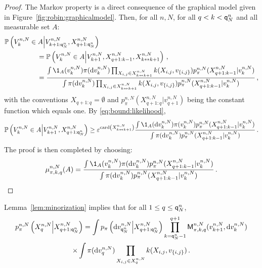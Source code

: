 \begin{proof}
The Markov property is a direct consequence of the graphical model given in Figure~\ref{fig:robin:graphicalmodel}. Then, for all $n,N$, for all $q< k < {\mathsf{q}}^{n}_{N}$ and all measurable set $A$:
\begin{align*}
\mathbb{P}\left(V^{n,N}_{k}\in A\middle|V^{n,N}_{k+1:\ordermax{n}{N}},X_{q+1:\ordermax{n}{N}}^{n,N}\right) &\\
 &\hspace{-3.2cm}= \mathbb{P}\left(V^{n,N}_{k}\in A\middle|V^{n,N}_{k+1},X^{n,N}_{q+1:k-1},X^{n,N}_{k\link k+1}\right)\eqsp,\\
 &\hspace{-3.2cm}= \frac{\int \1_{A}(v^{n,N}_{k})\pi(\rmd v^{n,N}_{k})\prod_{X_{i,j}\in X^{n,N}_{k\link k+1}}\condlik(X_{i,j},v_{\{i,j\}})p_{\pi}^{n,N}(X^{n,N}_{q+1:k-1}|v^{n,N}_{k})}{\int \pi(\rmd v^{n,N}_{k})\prod_{X_{i,j}\in X^{n,N}_{k\link k+1}}\condlik(X_{i,j},v_{\{i,j\}})p_{\pi}^{n,N}(X^{n,N}_{q+1:k-1}|v^{n,N}_{k})}\eqsp,
\end{align*}
with the conventions $X_{q+1:q} = \emptyset$ and $p_{\pi}^{n,N}(X^{n,N}_{q+1:q}|v^{n,N}_{q+1})$ being the constant function which equals one. By \eqref{eq:bound:likelihood},
\[
\mathbb{P}\left(V^{n,N}_{k}\in A\middle|V^{n,N}_{k+1},X_{q+1:\ordermax{n}{N}}^{n,N}\right)
\ge \varepsilon^{\card\left(X^{n,N}_{k\link k+1}\right)}\frac{\int \1_{A}(\rmd v^{n,N}_{k})\pi(v^{n,N}_{k})p_{\pi}^{n,N}(X^{n,N}_{q+1:k-1}|v^{n,N}_{k})}{\int \pi(\rmd v^{n,N}_{k})p_{\pi}^{n,N}(X^{n,N}_{q+1:k-1}|v^{n,N}_{k})}\eqsp. 
\]
The proof is then completed by choosing:
\[
\mu^{n,N}_{\pi,k,q}(A) = \frac{\int \1_{A}(v^{n,N}_{k})\pi(\rmd v^{n,N}_{k})p_{\pi}^{n,N}(X^{n,N}_{q+1:k-1}|v^{n,N}_{k})}{\int \pi(\rmd v^{n,N}_{k})p_{\pi}^{n,N}(X^{n,N}_{q+1:k-1}|v^{n,N}_{k})}\eqsp. 
\]
\end{proof}
Lemma~\ref{lem:minorization} implies that for all $1\le q\le {\mathsf{q}}^{n}_{N}$,
\begin{multline*}
p_{\pi}^{n,N}\left(X^{n,N}_{q}\middle|X^{n,N}_{q+1:{\mathsf{q}}^{n}_{N}}\right) = \int p_{\pi}\left(\mathrm{d} v_{{\mathsf{q}}^{n}_{N}}^{n,N}\middle | X^{n,N}_{q+1:{\mathsf{q}}^{n}_{N}}\right) \prod_{k ={\mathsf{q}}^{n}_{N}-1}^{q+1}\mathsf{M}^{n,N}_{\pi,k,q}(v_{k+1}^{n,N},\mathrm{d} v_k^{n,N})\\
\times\int \pi(\mathrm{d} v_q^{n,N})\prod_{X_{i,j}\in X_{q}^{n,N}}k(X_{i,j},v_{\{i,j\}})\,.
\end{multline*}

